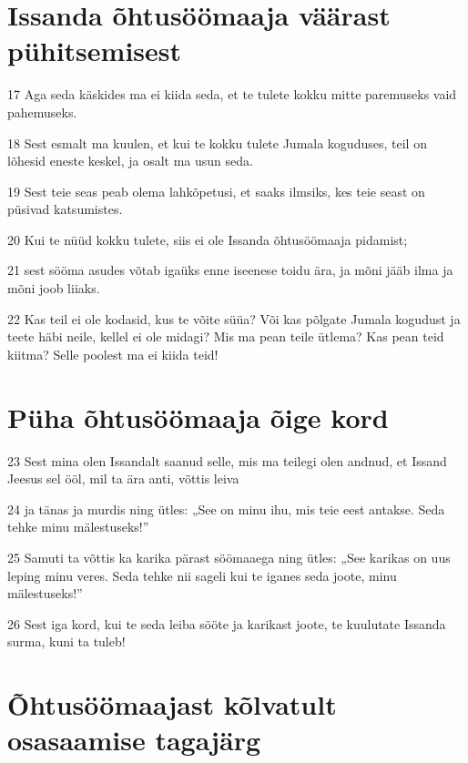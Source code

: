 \section*{Issanda õhtusöömaaja väärast pühitsemisest}

\par 17 Aga seda käskides ma ei kiida seda, et te tulete kokku mitte paremuseks vaid pahemuseks.
\par 18 Sest esmalt ma kuulen, et kui te kokku tulete Jumala koguduses, teil on lõhesid eneste keskel, ja osalt ma usun seda.
\par 19 Sest teie seas peab olema lahkõpetusi, et saaks ilmsiks, kes teie seast on püsivad katsumistes.
\par 20 Kui te nüüd kokku tulete, siis ei ole Issanda õhtusöömaaja pidamist;
\par 21 sest sööma asudes võtab igaüks enne iseenese toidu ära, ja mõni jääb ilma ja mõni joob liiaks.
\par 22 Kas teil ei ole kodasid, kus te võite süüa? Või kas põlgate Jumala kogudust ja teete häbi neile, kellel ei ole midagi? Mis ma pean teile ütlema? Kas pean teid kiitma? Selle poolest ma ei kiida teid!

\section*{Püha õhtusöömaaja õige kord}

\par 23 Sest mina olen Issandalt saanud selle, mis ma teilegi olen andnud, et Issand Jeesus sel ööl, mil ta ära anti, võttis leiva
\par 24 ja tänas ja murdis ning ütles: „See on minu ihu, mis teie eest antakse. Seda tehke minu mälestuseks!”
\par 25 Samuti ta võttis ka karika pärast söömaaega ning ütles: „See karikas on uus leping minu veres. Seda tehke nii sageli kui te iganes seda joote, minu mälestuseks!”
\par 26 Sest iga kord, kui te seda leiba sööte ja karikast joote, te kuulutate Issanda surma, kuni ta tuleb!

\section*{Õhtusöömaajast kõlvatult osasaamise tagajärg}

